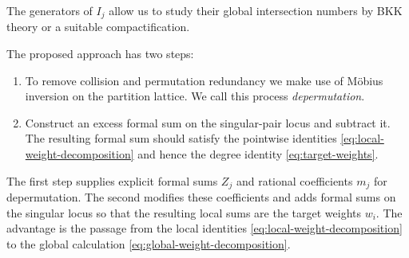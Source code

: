 \documentclass[11pt]{article}
\theoremstyle{definition}
\begin{document}
The generators of $I_j$ allow us to study their global
intersection numbers by BKK theory or a suitable compactification.

The proposed approach has two steps:
\begin{enumerate}
 \item To remove collision and permutation redundancy we make use of M\"obius inversion on the partition lattice. We call this process {\em depermutation}.
 \item Construct an excess formal sum on the singular-pair locus and subtract it.
 The resulting formal sum should satisfy the pointwise identities
 \eqref{eq:local-weight-decomposition} and hence the degree identity
 \eqref{eq:target-weights}.
\end{enumerate}
The first step supplies explicit formal sums $Z_j$ and rational coefficients
$m_j$ for depermutation. The second modifies these coefficients and adds
formal sums on the singular locus so that the resulting local sums are the
target weights $w_i$. The advantage is the passage from the local
identities \eqref{eq:local-weight-decomposition} to the global calculation
\eqref{eq:global-weight-decomposition}.
\end{document}
